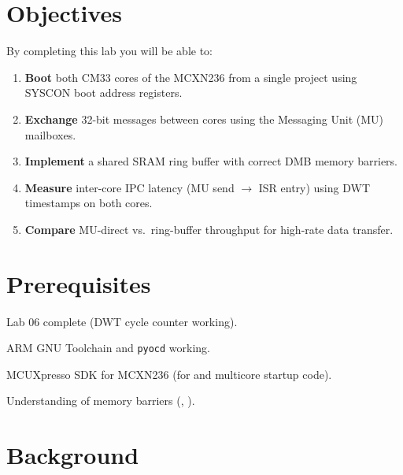 \documentclass[11pt, a4paper]{article}
\begin{document}

\section{Objectives}

By completing this lab you will be able to:

\begin{enumerate}[noitemsep, leftmargin=*]
  \item \textbf{Boot} both CM33 cores of the MCXN236 from a single project using SYSCON
        boot address registers.
  \item \textbf{Exchange} 32-bit messages between cores using the Messaging Unit (MU)
        mailboxes.
  \item \textbf{Implement} a shared SRAM ring buffer with correct DMB memory barriers.
  \item \textbf{Measure} inter-core IPC latency (MU send $\to$ ISR entry) using DWT
        timestamps on both cores.
  \item \textbf{Compare} MU-direct vs.\ ring-buffer throughput for high-rate data
        transfer.
\end{enumerate}

\section{Prerequisites}

\begin{checklist}
  \item Lab 06 complete (DWT cycle counter working).
  \item ARM GNU Toolchain and \texttt{pyocd} working.
  \item MCUXpresso SDK for MCXN236 (for  and multicore startup code).
  \item Understanding of memory barriers (, ).
\end{checklist}

\section{Background}
\end{document}
